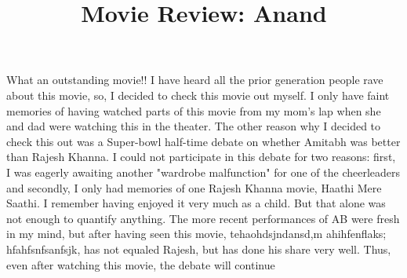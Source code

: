 \documentclass[12pt, a4paper]{article}
\title{Movie Review: Anand}
\author{}
\date{}
\begin{document}
\maketitle
What an outstanding movie!! I have heard all the prior generation people rave about this movie, so, I decided to check this movie out myself. I only have faint memories of having watched parts of this movie from my mom's lap when she and dad were watching this in the theater. The other reason why I decided to check this out was a Super-bowl half-time debate on whether Amitabh was better than Rajesh Khanna. I could not participate in this debate for two reasons: first, I was eagerly awaiting another "wardrobe malfunction" for one of the cheerleaders and secondly, I only had memories of one Rajesh Khanna movie, Haathi Mere Saathi. I remember having enjoyed it very much as a child. But that alone was not enough to quantify anything. The more recent performances of AB were fresh in my mind, but after having seen this movie, tehaohdsjndansd,m  ahihfenflaks;  hfahfsnfsanfsjk, has not equaled Rajesh, but has done his share very well. Thus, even after watching this movie, the debate will continue \par
\end{document}
